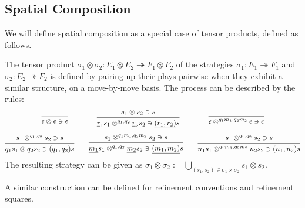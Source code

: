 \documentclass[acmsmall,nonacm]{acmart}
\begin{document}
\subsection{Spatial Composition}

We will define spatial composition as a special case of tensor products,
defined as follows.

\begin{definition}
The tensor product
$\sigma_1 \otimes \sigma_2 : E_1 \otimes E_2 \twoheadrightarrow F_1 \otimes F_2$
of the strategies
$\sigma_1 : E_1 \twoheadrightarrow F_1$ and
$\sigma_2 : E_2 \twoheadrightarrow F_2$
is defined by pairing up their plays pairwise
when they exhibit a similar structure, on a move-by-move basis.
The process can be described by the rules:
\begin{gather*}
  \qquad
  \begin{prooftree}
    \infer0{\epsilon \otimes \epsilon &\ni \epsilon}
  \end{prooftree}
  \qquad\qquad
  \begin{prooftree}
    \hypo{s_1 \otimes s_2 \ni s}
    \infer1{
      \underline{r}_1 s_1 \otimes^{q_1,q_2} \underline{r}_2 s_2 \ni
      \underline{(r_1, r_2)} s
    }
  \end{prooftree}
  \qquad\qquad
  \begin{prooftree}
    \infer0{\epsilon \otimes^{q_1m_1,q_2m_2} \epsilon \ni \epsilon}
  \end{prooftree}
  \qquad
  \\[1ex]
  \begin{prooftree}
    \hypo{s_1 \otimes^{q_1,q_2} s_2 \ni s}
    \infer1{q_1 s_1 \otimes q_2 s_2 \ni (q_1, q_2) s}
  \end{prooftree}
  \qquad
  \begin{prooftree}
    \hypo{s_1 \otimes^{q_1m_1,q_2m_2} s_2 \ni s}
    \infer1{
      \underline{m_1} s_1 \otimes^{q_1,q_2} \underline{m_2} s_2 \ni
      \underline{(m_1, m_2)} s
    }
  \end{prooftree}
  \qquad
  \begin{prooftree}
    \hypo{s_1 \otimes^{q_1,q_2} s_2 \ni s}
    \infer1{n_1s_1 \otimes^{q_1m_1,q_2m_2} n_2s_2 \ni (n_1,n_2)s}
  \end{prooftree}
\end{gather*}
The resulting strategy can be given as
$\sigma_1 \otimes \sigma_2 :=
 \bigcup_{(s_1, s_2) \in \sigma_1 \times \sigma_2} s_1 \otimes s_2$.
\end{definition}

A similar construction can be defined for
refinement conventions and refinement squares.
\end{document}
